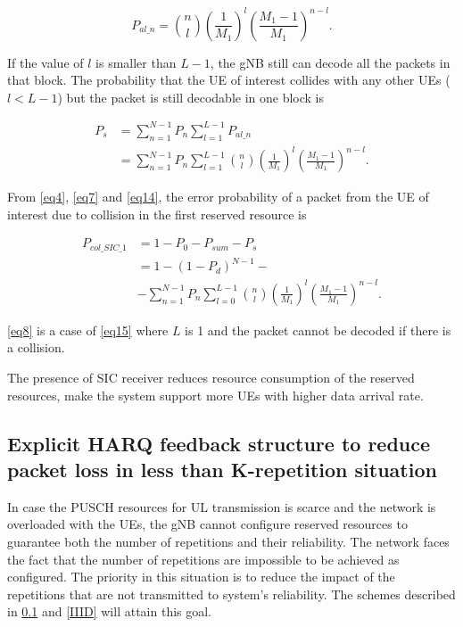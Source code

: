 \documentclass{ieeeaccess}
\begin{document}
\begin{equation}
P_{al\_n} = \binom {n}{l}(\frac{1}{M_{1}})^{l}
(\frac {M_{1}-1}{M_{1}})^{n-l}.\label{eq13}
\end{equation}

If the value of $l$ is smaller than $L-1$, the gNB still can decode all the packets in that block. The probability that the UE of interest collides with any other UEs ($l<L-1$) but the packet is still decodable in one block is

\begin{align}
P_{s} &= \sum_{n=1}^{N-1} P_{n}\sum_{l=1}^{L-1}P_{al\_n} \nonumber\\
 &= \sum_{n=1}^{N-1} P_{n}\sum_{l=1}^{L-1}\binom {n}{l}(\frac{1}{M_{1}})^{l}
(\frac {M_{1}-1}{M_{1}})^{n-l}.\label{eq14}
\end{align}

From \eqref{eq4}, \eqref{eq7} and \eqref{eq14}, the error probability of a packet from the UE of interest due to collision in the first reserved resource is

\begin{align}
P_{col\_SIC\_1} &= 1 - P_{0} - P_{sum} - P_{s} \nonumber\\
 &= 1- (1-P_{d})^{N-1} - \nonumber\\
 &- \sum_{n=1}^{N-1} P_{n}\sum_{l=0}^{L-1}\binom {n}{l}(\frac{1}{M_{1}})^{l}
(\frac {M_{1}-1}{M_{1}})^{n-l}.\label{eq15}
\end{align}

\eqref{eq8} is a case of \eqref{eq15} where $L$ is 1 and the packet cannot be decoded if there is a collision. 

The presence of SIC receiver reduces resource consumption of the reserved resources, make the system support more UEs with higher data arrival rate.

\subsection{Explicit HARQ feedback structure to reduce packet loss in less than K-repetition situation}\label{IIIC}

In case the PUSCH resources for UL transmission is scarce and the network is overloaded with the UEs, the gNB cannot configure reserved resources to guarantee both the number of repetitions and their reliability. The network faces the fact that the number of repetitions are impossible to be achieved as configured. The priority in this situation is to reduce the impact of the repetitions that are not transmitted to system's reliability. The schemes described in \ref{IIIC} and \ref{IIID} will attain this goal.
\end{document}
